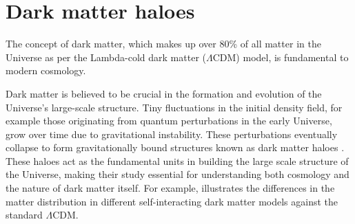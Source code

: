 

\section{Dark matter haloes}

The concept of dark matter, which makes up over 80\% of all matter in the Universe as per the Lambda-cold dark matter ($\Lambda$CDM) model, is fundamental to modern cosmology.  

Dark matter is believed to be crucial in the formation and evolution of the Universe's large-scale structure. Tiny fluctuations in the initial density field, for example those originating from quantum perturbations in the early Universe, grow over time due to gravitational instability. These perturbations eventually collapse to form gravitationally bound structures known as dark matter haloes \citep[][]{1974ApJ...187..425P,2002PhR...372....1C}. These haloes act as the fundamental units in building the large scale structure of the Universe, making their study essential for understanding both cosmology and the nature of dark matter itself. For example,  illustrates the differences in the matter distribution in different self-interacting dark matter models against the standard $\Lambda$CDM.

